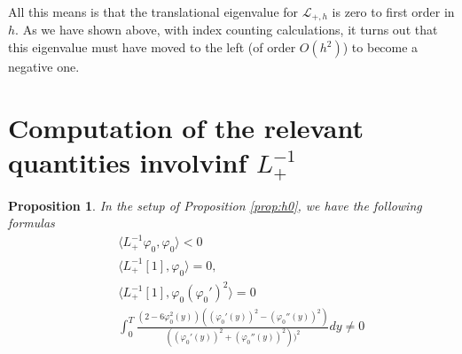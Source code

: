 \documentclass[12pt]{amsart}
\newtheorem{proposition}{Proposition}
\theoremstyle{definition}
\theoremstyle{remark}
\numberwithin{equation}{section}
\renewcommand{\(}{\left(}
\renewcommand{\)}{\right)}
\renewcommand{\[}{\left[}
\renewcommand{\]}{\right]}
\newcommand{\f}[2]{\frac{#1}{#2}}
\newcommand{\cl}{{\mathcal L}}
\newcommand{\vp}{\varphi}
\newcommand{\dpr}[2]{\langle #1,#2 \rangle}
\begin{document}
   All this means is that the translational eigenvalue for $\cl_{+,h}$  is zero to first order in $h$. As we have shown above, with index counting calculations, it turns out that this eigenvalue must have moved to the left (of order $O(h^2)$) to become a negative one.


   \section{Computation of the relevant quantities involvinf $L_+^{-1}$}

   \begin{proposition}
   	\label{antany}
   In the setup of Proposition \ref{prop:h0}, we have the following formulas
   \begin{eqnarray}
   \label{ant1}
   & & \dpr{L_+^{-1} \vp_0}{\vp_0} <0 \\
   \label{ant2}
 & &   \dpr{L_+^{-1}[1]}{\vp_0}=0, \\
 & & \label{ant3}
 \dpr{ L_{+}^{-1}[1]}{\vp_0 (\vp_0')^2}=0 \\
   \label{ant4}    	
   & & 	\int_0^T \f{(2-6\vp_0^2(y))((\vp_0'(y))^2-(\vp_0''(y))^2)}{((\vp_0'(y))^2+(\vp_0''(y))^2))^2} dy\neq 0
\end{eqnarray}
   \end{proposition}
\end{document}
